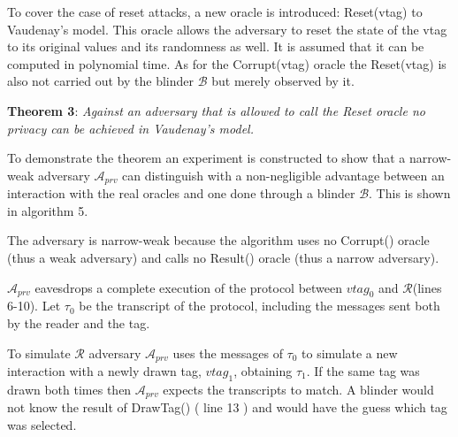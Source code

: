     To cover the case of reset attacks, a new oracle is introduced: Reset(vtag) to Vaudenay's model. This oracle allows the adversary to reset the state of the vtag
    to its original values and its randomness as well. It is assumed that it can be computed in polynomial time. As for the Corrupt(vtag) oracle the Reset(vtag) is also not carried out
    by the blinder $\mathcal{B}$ but merely observed by it.

    \textbf{Theorem 3}: \textit{Against an adversary that is allowed to call the Reset oracle no privacy can be achieved in Vaudenay's model.}

    To demonstrate the theorem an experiment is constructed to show that a narrow-weak adversary $\mathcal{A}_{prv}$ can distinguish with a non-negligible advantage 
    between an interaction with the real oracles and one done through a blinder $\mathcal{B}$. This is shown in algorithm 5.
    
    The adversary is narrow-weak because the algorithm uses no Corrupt() oracle (thus a weak adversary) and calls no Result() oracle 
    (thus a narrow adversary).

    $\mathcal{A}_{prv}$ eavesdrops a complete execution of the protocol between $vtag_{0}$ and $\mathcal{R}$(lines 6-10). Let $\tau_{0}$ be the transcript of the protocol, including the messages
    sent both by the reader and the tag.

    To simulate $\mathcal{R}$ adversary $\mathcal{A}_{prv}$ uses the messages of $\tau_{0}$ to simulate a new interaction with a newly drawn tag, $vtag_{1}$, obtaining $\tau_{1}$. If the same tag was
    drawn both times then $\mathcal{A}_{prv}$ expects the transcripts to match. A blinder would not know the result of DrawTag() ( line 13 ) and would have the guess which tag was
    selected. 
    
